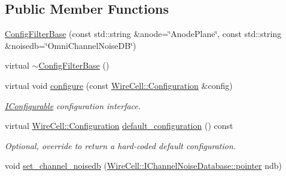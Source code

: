 \subsection*{Public Member Functions}
\begin{DoxyCompactItemize}
\item 
\hyperlink{class_wire_cell_1_1_sig_proc_1_1_microboone_1_1_config_filter_base_af5f3172d8f68d3834970d590aa348cd8}{Config\+Filter\+Base} (const std\+::string \&anode=\char`\"{}Anode\+Plane\char`\"{}, const std\+::string \&noisedb=\char`\"{}Omni\+Channel\+Noise\+DB\char`\"{})
\item 
virtual \hyperlink{class_wire_cell_1_1_sig_proc_1_1_microboone_1_1_config_filter_base_af9010fccd827a5a343ed36dc49a3a239}{$\sim$\+Config\+Filter\+Base} ()
\item 
virtual void \hyperlink{class_wire_cell_1_1_sig_proc_1_1_microboone_1_1_config_filter_base_ad71e79a991c880b405baf0bd941f9efd}{configure} (const \hyperlink{namespace_wire_cell_a9f705541fc1d46c608b3d32c182333ee}{Wire\+Cell\+::\+Configuration} \&config)
\begin{DoxyCompactList}\small\item\em \hyperlink{class_wire_cell_1_1_i_configurable}{I\+Configurable} configuration interface. \end{DoxyCompactList}\item 
virtual \hyperlink{namespace_wire_cell_a9f705541fc1d46c608b3d32c182333ee}{Wire\+Cell\+::\+Configuration} \hyperlink{class_wire_cell_1_1_sig_proc_1_1_microboone_1_1_config_filter_base_a4795943bb21fa1857b5a566f86be67ac}{default\+\_\+configuration} () const
\begin{DoxyCompactList}\small\item\em Optional, override to return a hard-\/coded default configuration. \end{DoxyCompactList}\item 
void \hyperlink{class_wire_cell_1_1_sig_proc_1_1_microboone_1_1_config_filter_base_ade9757d913c71d3083f36c667c2ce73c}{set\+\_\+channel\+\_\+noisedb} (\hyperlink{class_wire_cell_1_1_i_component_a744b962ee9489c909f1b0f1fe2533798}{Wire\+Cell\+::\+I\+Channel\+Noise\+Database\+::pointer} ndb)
\end{DoxyCompactItemize}

